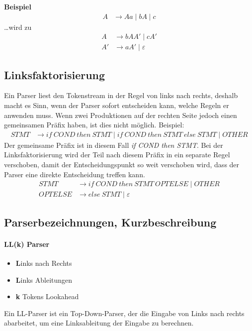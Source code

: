 \textbf{Beispiel}
%
\begin{align*}
	A &\rightarrow Aa \mid bA \mid c
\end{align*}
%
\ldots{wird} zu
%
\begin{align*}
	A  &\rightarrow bAA' \mid cA' \\
	A' &\rightarrow aA' \mid \varepsilon 
\end{align*}


\subsection{Linksfaktorisierung}

Ein Parser liest den Tokenstream in der Regel von links nach rechts, deshalb
macht es Sinn, wenn der Parser sofort entscheiden kann, welche Regeln er
anwenden muss.  Wenn zwei Produktionen auf der rechten Seite jedoch einen
gemeinsamen Präfix haben, ist dies nicht möglich. Beispiel:
%
\begin{align*}
	STMT &\rightarrow if~COND~then~STMT \mid if~COND~then~STMT~else~STMT \mid OTHER
\end{align*}
%
Der gemeinsame Präfix ist in diesem Fall \textit{if COND then STMT}. Bei der
Linksfaktorisierung wird der Teil nach diesem Präfix in ein separate Regel
verschoben, damit der Entscheidungspunkt so weit verschoben wird, dass der
Parser eine direkte Entscheidung treffen kann.
%
\begin{align*}
	STMT &\rightarrow if~COND~then~STMT~OPTELSE \mid OTHER \\
	OPTELSE &\rightarrow else~STMT \mid \varepsilon
\end{align*}
%

\subsection{Parserbezeichnungen, Kurzbeschreibung}

\paragraph{LL(k) Parser}

\begin{itemize}
	\item \textbf{L}inks nach Rechts
	\item \textbf{L}inks Ableitungen
	\item \textbf{k} Tokens Lookahead
\end{itemize}
Ein LL-Parser ist ein Top-Down-Parser, der die Eingabe von Links nach rechts abarbeitet, um eine Linksableitung der Eingabe zu berechnen.

